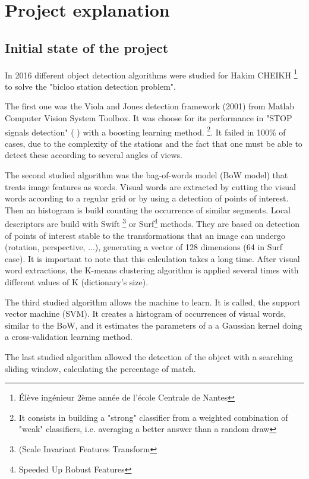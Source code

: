 \documentclass[10pt]{article}
\begin{document}
\newpage
    \section{Project explanation}
    \subsection{Initial state of the project}
    
In 2016 different object detection algorithms were studied for Hakim CHEIKH \footnote{Élève ingénieur 2ème année de l’école Centrale de Nantes} to solve the "bicloo station detection problem".

The first one was the Viola and Jones detection framework (2001) from Matlab Computer Vision System Toolbox. It was choose for its performance in "STOP signals detection" (\cite{LectureA} ) with a boosting learning method. \footnote{It consists in building a "strong" classifier from a weighted combination of "weak" classifiers, i.e. averaging a better answer than a random draw}. It failed
in 100\% of cases, due to the complexity of the stations and the fact that one must be able to detect these according to several angles of views.

The second studied algorithm was the bag-of-words model (BoW model) that treats image features as words. Visual words are extracted by cutting the visual words according to a regular grid or by using a detection of points of interest.
Then an histogram is build counting the occurrence of similar segments. 
Local descriptors are build with Swift \footnote{(Scale Invariant Features Transform} or Surf\footnote{Speeded Up Robust Features} methods. They are based on detection of points of interest stable to the transformations that an image can undergo (rotation, perspective, ...), generating a vector of 128 dimensions (64 in Surf case). It is important to note that this calculation takes a long time. After visual word extractions, the K-means  clustering algorithm is applied several times with different values of K (dictionary's size).

 
The third studied algorithm allows the machine to learn. It is called, the support vector machine (SVM). It creates a histogram of occurrences of visual words, similar to the BoW, and it estimates the parameters of a a Gaussian kernel doing a cross-validation learning method. 


The last studied algorithm allowed the detection of the object with a searching sliding window, calculating the percentage of match.
\end{document}
